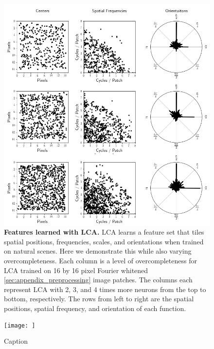 \begin{figure}[h]\label{fig:ch2_lca_overcompleteness_tiling}
    \centering
    \includegraphics[width=\textwidth]{figures/lca_overcompleteness_location_frequency_centers.png}
    \caption{\textbf{Features learned with LCA.} LCA learns a feature set that tiles spatial positions, frequencies, scales, and orientations when trained on natural scenes. Here we demonstrate this while also varying overcompleteness. Each column is a level of overcompleteness for LCA trained on 16 by 16 pixel Fourier whitened \ref{sec:appendix_preprocessing} image patches. The columns each represent LCA with 2, 3, and 4 times more neurons from the top to bottom, respectively. The rows from left to right are the spatial positions, spatial frequency, and orientation of each function.}
\end{figure}

\begin{figure}
    \centering
    \texttt{[image: ]}
    \caption{Caption}
    \label{fig:my_label}
\end{figure}


